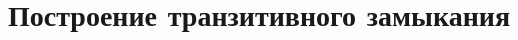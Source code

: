 \documentclass[discrete.tex]{subfiles}
\begin{document}
\section{Построение транзитивного замыкания}
\end{document}
